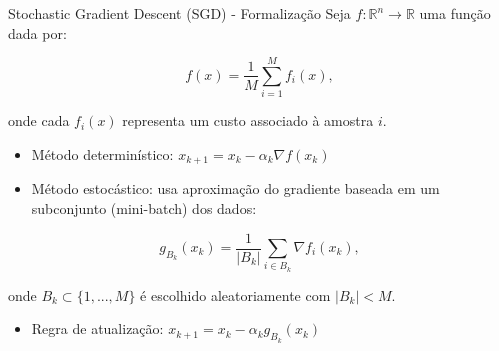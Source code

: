 \documentclass[aspectratio=1610]{beamer}
\begin{document}
\begin{frame}{Stochastic Gradient Descent (SGD) - Formalização}
Seja $f: \mathbb{R}^n \to \mathbb{R}$ uma função dada por:

\begin{equation}
    f(x) = \frac{1}{M} \sum_{i=1}^{M} f_i(x),
\end{equation}

onde cada $f_i(x)$ representa um custo associado à amostra $i$.

\begin{itemize}
    \item Método determinístico: $x_{k+1} = x_k - \alpha_k \nabla f(x_k)$
    \item Método estocástico: usa aproximação do gradiente baseada em um subconjunto (mini-batch) dos dados:
\end{itemize}

\begin{equation}
    g_{B_k}(x_k) = \frac{1}{|B_k|} \sum_{i \in B_k} \nabla f_i(x_k),
\end{equation}

onde $B_k \subset \{1, ..., M\}$ é escolhido aleatoriamente com $|B_k| < M$.

\begin{itemize}
    \item Regra de atualização: $x_{k+1} = x_k - \alpha_k g_{B_k}(x_k)$
\end{itemize}
\end{frame}
\end{document}
